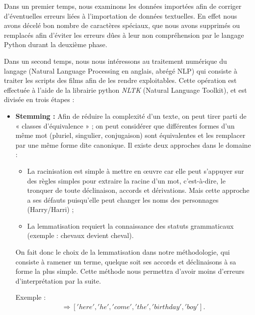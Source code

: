 \documentclass[11pt]{article}
\begin{document}
\begin{center}
Dans un premier temps, nous examinons les données importées afin de corriger d’éventuelles erreurs liées à l'importation de données textuelles. En effet nous avons décelé bon nombre de caractères spéciaux, que nous avons supprimés ou remplacés afin d'éviter les erreurs dûes à leur non compréhension par le langage Python durant la deuxième phase.\par

Dans un second temps, nous nous intéressons au traitement numérique du langage (Natural Language Processing en anglais, abrégé NLP) qui consiste à traiter les scripts des films afin de les rendre exploitables.
Cette opération est effectuée à l'aide de la librairie python \textit{NLTK} (Natural Language Toolkit), et est divisée en trois étapes :

\begin{itemize}
    \renewcommand{\labelitemi}{$\bullet$}
    \item \textbf{Stemming :} Afin de réduire la complexité d’un texte, on peut tirer parti de « classes d’équivalence » ; on peut considérer que différentes formes d’un même mot (pluriel, singulier, conjugaison) sont équivalentes et les remplacer par une même forme dite canonique. Il existe deux approches dans le domaine :
    
        \begin{itemize}
            \renewcommand{\labelitemii}{-}
            \item La racinisation est simple à mettre en œuvre car elle peut s’appuyer sur des règles simples pour extraire la racine d’un mot, c’est-à-dire, le tronquer de toute déclinaison, accords et dérivations. Mais cette approche a ses défauts puisqu’elle peut changer les noms des personnages (Harry/Harri) ;
                
            \item La lemmatisation requiert la connaissance des statuts grammaticaux (exemple : chevaux devient cheval).
        \end{itemize}
            
    On fait donc le choix de la lemmatisation dans notre méthodologie, qui consiste à ramener un terme, quelque soit ses accords et déclinaisons à sa forme la plus simple. Cette méthode nous permettra d'avoir moins d'erreurs d'interprétation par la suite.\par
    Exemple :
    \begin{align*}
    ['here', 'he', 'comes', 'the', 'birthday', 'boy'] \Rightarrow ['here', 'he', 'come', 'the', 'birthday', 'boy'].
    \end{align*}
    

\end{itemize}
\end{center}
\end{document}

